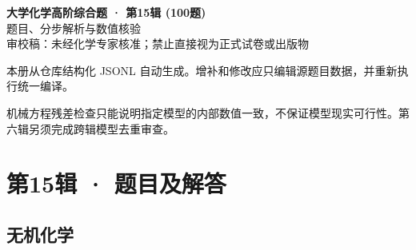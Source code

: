\documentclass[UTF8,11pt,a4paper]{ctexart}
\begin{document}
\begin{center}
{\LARGE\bfseries 大学化学高阶综合题 · 第15辑 (100题)}\\[0.8em]
{\large 题目、分步解析与数值核验}\\[0.5em]
{\small \textcolor{red!65!black}{审校稿：未经化学专家核准；禁止直接视为正式试卷或出版物}}
\end{center}
\vspace{1em}
\noindent 本册从仓库结构化 JSONL 自动生成。增补和修改应只编辑源题目数据，并重新执行统一编译。
\par 机械方程残差检查只能说明指定模型的内部数值一致，不保证模型现实可行性。第六辑另须完成跨辑模型去重审查。
\tableofcontents
\clearpage
\section*{第15辑 · 题目及解答}
\subsection*{无机化学}
\end{document}
